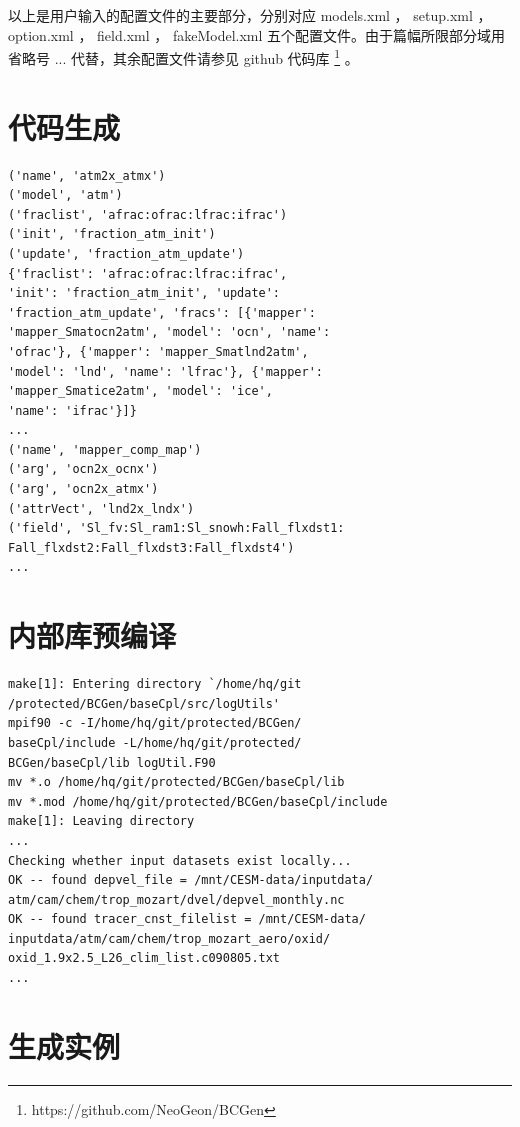 以上是用户输入的配置文件的主要部分，分别对应 models.xml ， setup.xml ， option.xml ， field.xml ，  fakeModel.xml 五个配置文件。由于篇幅所限部分域用省略号 ... 代替，其余配置文件请参见 github 代码库 \footnote{https://github.com/NeoGeon/BCGen} 。

\section {代码生成}

\begin{lstlisting}
('name', 'atm2x_atmx')
('model', 'atm')
('fraclist', 'afrac:ofrac:lfrac:ifrac')
('init', 'fraction_atm_init')
('update', 'fraction_atm_update')
{'fraclist': 'afrac:ofrac:lfrac:ifrac', 
'init': 'fraction_atm_init', 'update': 
'fraction_atm_update', 'fracs': [{'mapper': 
'mapper_Smatocn2atm', 'model': 'ocn', 'name': 
'ofrac'}, {'mapper': 'mapper_Smatlnd2atm',
'model': 'lnd', 'name': 'lfrac'}, {'mapper':
'mapper_Smatice2atm', 'model': 'ice',
'name': 'ifrac'}]}
...
('name', 'mapper_comp_map')
('arg', 'ocn2x_ocnx')
('arg', 'ocn2x_atmx')
('attrVect', 'lnd2x_lndx')
('field', 'Sl_fv:Sl_ram1:Sl_snowh:Fall_flxdst1:
Fall_flxdst2:Fall_flxdst3:Fall_flxdst4')
...
\end{lstlisting}

\section {内部库预编译}

\begin{lstlisting}
make[1]: Entering directory `/home/hq/git
/protected/BCGen/baseCpl/src/logUtils'
mpif90 -c -I/home/hq/git/protected/BCGen/
baseCpl/include -L/home/hq/git/protected/
BCGen/baseCpl/lib logUtil.F90 
mv *.o /home/hq/git/protected/BCGen/baseCpl/lib
mv *.mod /home/hq/git/protected/BCGen/baseCpl/include
make[1]: Leaving directory 
...
Checking whether input datasets exist locally...
OK -- found depvel_file = /mnt/CESM-data/inputdata/
atm/cam/chem/trop_mozart/dvel/depvel_monthly.nc
OK -- found tracer_cnst_filelist = /mnt/CESM-data/
inputdata/atm/cam/chem/trop_mozart_aero/oxid/
oxid_1.9x2.5_L26_clim_list.c090805.txt
...
\end{lstlisting}

\section {生成实例}

